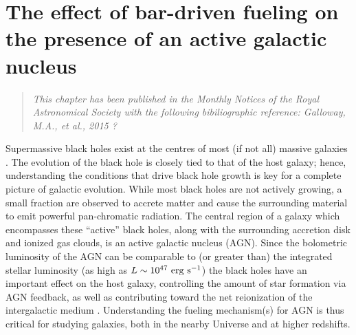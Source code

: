 
\chapter{The effect of bar-driven fueling on the presence of an active galactic nucleus}
\label{chap:baragn}

\begin{quote}
\emph{This chapter has been published in the Monthly Notices of the Royal Astronomical Society with the following bibiliographic reference:  Galloway, M.A., et al., 2015 ?}\\
\end{quote}

\newcommand\pfeatures{$p_{\rm{features~or~disk}}$}
\newcommand\pnotedgeon{$p_{\rm{not~edge-on}}$}
\newcommand\pbar{$p_{\rm{bar}}$}
\newcommand\pnobar{$p_{\rm{no~bar}}$}
\newcommand\gztwo{Galaxy~Zoo~2}
\newcommand\mbh{$M_{\rm{BH}}$}
\newcommand\db{$d_{\rm{B-NB}}$}
\newcommand\fb{$f_{\rm{B>NB}}$}
\newcommand\pasa{PASA}


Supermassive black holes exist at the centres of most (if not all) massive galaxies \citep{Kormendy1995,Richstone1998,Kormendy2001,Ghez2008}. The evolution of the black hole is closely tied to that of the host galaxy; hence, understanding the conditions that drive black hole growth is key for a complete picture of galactic evolution. While most black holes are not actively growing, a small fraction are observed to accrete matter and cause the surrounding material to emit powerful pan-chromatic radiation. The central region of a galaxy which encompasses these ``active'' black holes, along with the surrounding accretion disk and ionized gas clouds, is an active galactic nucleus (AGN). Since the bolometric luminosity of the AGN can be comparable to (or greater than) the integrated stellar luminosity (as high as $L\sim10^{47}~\rm{erg}~\rm{s}^{-1}$) the black holes have an important effect on the host galaxy, controlling the amount of star formation via AGN feedback, as well as contributing toward the net reionization of the intergalactic medium \citep{Heckman2014}. Understanding the fueling mechanism(s) for AGN is thus critical for studying galaxies, both in the nearby Universe and at higher redshifts. 

